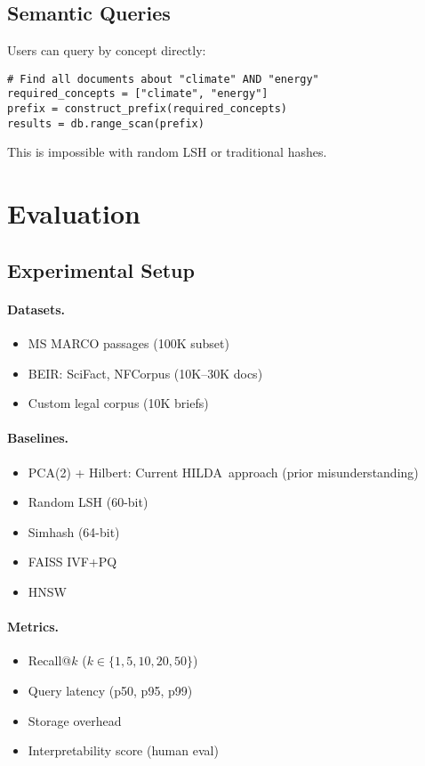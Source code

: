 \documentclass[11pt]{article}
\newcommand{\hilda}{\textsc{HILDA}}
\begin{document}
\subsection{Semantic Queries}

Users can query by concept directly:
\begin{verbatim}
# Find all documents about "climate" AND "energy"
required_concepts = ["climate", "energy"]
prefix = construct_prefix(required_concepts)
results = db.range_scan(prefix)
\end{verbatim}

This is impossible with random LSH or traditional hashes.

\section{Evaluation}

\subsection{Experimental Setup}

\paragraph{Datasets.}
\begin{itemize}
  \item MS MARCO passages (100K subset)
  \item BEIR: SciFact, NFCorpus (10K--30K docs)
  \item Custom legal corpus (10K briefs)
\end{itemize}

\paragraph{Baselines.}
\begin{itemize}
  \item PCA(2) + Hilbert: Current \hilda\ approach (prior misunderstanding)
  \item Random LSH (60-bit)
  \item Simhash (64-bit)
  \item FAISS IVF+PQ
  \item HNSW
\end{itemize}

\paragraph{Metrics.}
\begin{itemize}
  \item Recall@$k$ ($k \in \{1, 5, 10, 20, 50\}$)
  \item Query latency (p50, p95, p99)
  \item Storage overhead
  \item Interpretability score (human eval)
\end{itemize}
\end{document}
